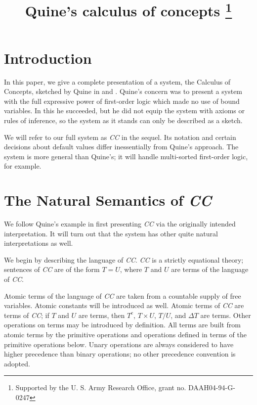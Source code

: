 
\title{Quine's calculus of concepts \footnote{Supported by the U. S. Army Research Office, grant no. DAAH04-94-G-0247}}

\maketitle
\section{Introduction}

In this paper, we give a complete presentation of a system, the
Calculus of Concepts, sketched by Quine in \cite{concepts} and
\cite{negative}.  Quine's concern was to present
a system with the full expressive power of first-order logic which
made no use of bound variables.  In this he succeeded, but he did not
equip the system with axioms or rules of inference, so the system as
it stands can only be described as a sketch.

We will refer to our full system as {\em CC\/} in the sequel.  Its
notation and certain decisions about default values differ
inessentially from Quine's approach.  The system is more general than
Quine's; it will handle multi-sorted first-order logic, for example.

\section{The Natural Semantics of {\em CC\/}}

We follow Quine's example in first presenting {\em CC\/} via the
originally intended interpretation.  It will turn out that the system
has other quite natural interpretations as well.

We begin by describing the language of {\em CC\/}.  {\em CC\/} is a
strictly equational theory; sentences of {\em CC\/} are of the form $T
= U$, where $T$ and $U$ are terms of the language of {\em CC\/}.

Atomic terms of the language of {\em CC\/} are taken from a countable
supply of free variables.  Atomic constants will be introduced as
well.  Atomic terms of {\em CC\/} are terms of {\em CC\/}; if $T$ and
$U$ are terms, then $T^c$, $T\times U$, $T/U$, and $\Delta T$ are
terms.  Other operations on terms may be introduced by definition.
All terms are built from atomic terms by the primitive operations and
operations defined in terms of the primitive operations below.  Unary
operations are always considered to have higher precedence than binary
operations; no other precedence convention is adopted.

